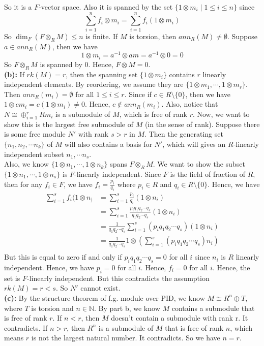 \documentclass[12pt]{amsart}
\newcommand{\N}{\mathbb{N}}
\begin{document}
So it is a $F$-vector space. Also it is spanned by the set $\{1\otimes m_i\mid 1\leq i\leq n\}$ since 
\[\sum_{i=1}^nf_i\otimes m_i=\sum_{i=1}^nf_i(1\otimes m_i)\] 
So $\dim_F(F\otimes_R M)\leq n$ is finite. If $M$ is torsion, then $ann_R(M)\neq \emptyset$. Suppose $a\in ann_R(M)$, then we have 
\[1\otimes m_i=a^{-1}\otimes am=a^{-1}\otimes 0=0 \]
So $F\otimes_R M$ is spanned by $0$. Hence, $F\otimes M=0$.\\
\textbf{(b): }If $rk(M)=r$, then the spanning set $\{1\otimes m_i\}$ contains $r$ linearly independent elements. By reordering, we assume they are $\{1\otimes m_1,\cdots, 1\otimes m_r\}$. Then $ann_R(m_i)=\emptyset$ for all $1\leq i\leq r$. Since if $c\in R\setminus\{0\}$, then we have $1\otimes cm_i=c(1\otimes m_i)\neq 0$. Hence, $c\notin ann_R(m_i)$. Also, notice that 
$N\cong \oplus_{i=1}^r Rm_i$ is a submodule of $M$, which is free of rank $r$. Now, we want to show this is the largest free submodule of $M$ (in the sense of rank). Suppose there is some free module $N'$ with rank $s>r$ in $M$. Then the generating set $\{n_1,n_2,\cdots n_k\}$ of $M$ will also contains a basis for $N'$, which will gives an $R$-linearly independent subset $n_1,\cdots n_s$.\\
Also, we know $\{1\otimes n_1,\cdots,1\otimes n_k\}$ spans $F\otimes_R M$. We want to show the subset $\{1\otimes n_1,\cdots,1\otimes n_s\}$ is $F$-linearly independent. Since $F$ is the field of fraction of $R$, then for any $f_i\in F$, we have $f_i=\frac{p_i}{q_i}$ where $p_i\in R$ and $q_i\in R\setminus\{0\}$. Hence, we have
\begin{align*}
    \sum_{i=1}^sf_i(1\otimes n_)&=\sum_{i=1}^s\frac{p_i}{q_i}(1\otimes n_i)\\
    &=\sum_{i=1}^s\frac{p_iq_1q_2\cdots q_s}{q_1q_2\cdots q_s}(1\otimes n_i)\\
    &=\frac{1}{q_1q_2\cdots q_s}\sum_{i=1}^s(p_iq_1q_2\cdots q_s)(1\otimes n_i)\\
    &=\frac{1}{q_1q_2\cdots q_s}1\otimes (\sum_{i=1}^s(p_iq_1q_2\cdots q_s)n_i)\\
\end{align*}
But this is equal to zero if and only if $p_iq_1q_2\cdots q_s=0$ for all $i$ since $n_i$ is $R$ linearly independent. Hence, we have $p_i=0$ for all $i$. Hence, $f_i=0$ for all $i$. Hence, the set is $F$-linearly independent. But this contradicts the assumption $rk(M)=r<s$. So $N'$ cannot exist.
\\
\textbf{(c): }By the structure theorem of f.g. module over PID, we know $M\cong R^n\oplus T$, where $T$ is torsion and $n\in\N$. By part b, we know $M$ contains a submodule that is free of rank $r$. If $n<r$, then $M$ doesn't contain a submodule with rank r. It contradicts. If $n>r$, then $R^n$ is a submodule of $M$ that is free of rank $n$, which means $r$ is not the largest natural number. It contradicts. So we have $n=r$.  
\end{document}
